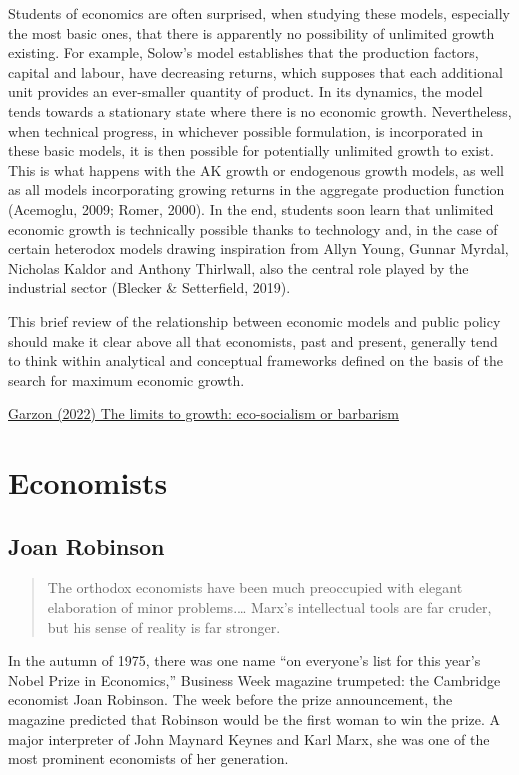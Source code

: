\documentclass[
]{book}
\begin{document}
Students of economics are often surprised, when studying these models, especially the most basic ones, that there is apparently no possibility of unlimited growth existing. For example, Solow's model establishes that the production factors, capital and labour, have decreasing returns, which supposes that each additional unit provides an ever-smaller quantity of product. In its dynamics, the model tends towards a stationary state where there is no economic growth. Nevertheless, when technical progress, in whichever possible formulation, is incorporated in these basic models, it is then possible for potentially unlimited growth to exist. This is what happens with the AK growth or endogenous growth models, as well as all models incorporating growing returns in the aggregate production function (Acemoglu, 2009; Romer, 2000). In the end, students soon learn that unlimited economic growth is technically possible thanks to technology and, in the case of certain heterodox models drawing inspiration from Allyn Young, Gunnar Myrdal, Nicholas Kaldor and Anthony Thirlwall, also the central role played by the industrial sector (Blecker \& Setterfield, 2019).

This brief review of the relationship between economic models and public policy should make it clear above all that economists, past and present, generally tend to think within analytical and conceptual frameworks defined on the basis of the search for maximum economic growth.

\href{https://la-u.org/the-limits-to-growth-eco-socialism-or-barbarism/}{Garzon (2022) The limits to growth: eco-socialism or barbarism}

\hypertarget{economists}{%
\chapter{Economists}\label{economists}}

\hypertarget{joan-robinson}{%
\section{Joan Robinson}\label{joan-robinson}}

\begin{quote}
The orthodox economists have been much preoccupied with elegant elaboration of minor
problems.\ldots{} Marx's intellectual tools are far cruder, but his sense of reality is far stronger.
\end{quote}

In the autumn of 1975, there was one name ``on everyone's list for this year's Nobel Prize in Economics,'' Business Week magazine trumpeted: the Cambridge economist Joan Robinson. The week before the prize announcement, the magazine predicted that Robinson would be the first woman to win the prize. A major interpreter of John Maynard Keynes and Karl Marx, she was one of the most prominent economists of her generation.
\end{document}
